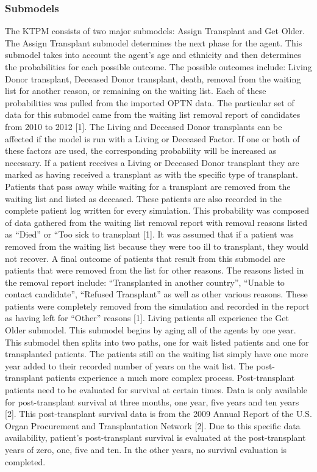 \documentclass[9pt,a4paper,twocolumn]{scrartcl}
\begin{document}
\subsubsection{Submodels}
The KTPM consists of two major submodels: Assign Transplant and Get Older.
The Assign Transplant submodel determines the next phase for the agent.  This submodel takes into account the agent’s age and ethnicity and then determines the probabilities for each possible outcome.  The possible outcomes include: Living Donor transplant, Deceased Donor transplant, death, removal from the waiting list for another reason, or remaining on the waiting list.  Each of these probabilities was pulled from the imported OPTN data.  The particular set of data for this submodel came from the waiting list removal report of candidates from 2010 to 2012 [1].  The Living and Deceased Donor transplants can be affected if the model is run with a Living or Deceased Factor.  If one or both of these factors are used, the corresponding probability will be increased as necessary.
If a patient receives a Living or Deceased Donor transplant they are marked as having received a transplant as with the specific type of transplant.  Patients that pass away while waiting for a transplant are removed from the waiting list and listed as deceased.  These patients are also recorded in the complete patient log written for every simulation.  This probability was composed of data gathered from the waiting list removal report with removal reasons listed as “Died” or “Too sick to transplant [1].  It was assumed that if a patient was removed from the waiting list because they were too ill to transplant, they would not recover.  
A final outcome of patients that result from this submodel are patients that were removed from the list for other reasons.  The reasons listed in the removal report include: “Transplanted in another country”, “Unable to contact candidate”, “Refused Transplant” as well as other various reasons.  These patients were completely removed from the simulation and recorded in the report as having left for “Other” reasons [1].
Living patients all experience the Get Older submodel.  This submodel begins by aging all of the agents by one year.  This submodel then splits into two paths, one for wait listed patients and one for transplanted patients.  The patients still on the waiting list simply have one more year added to their recorded number of years on the wait list.  The post-transplant patients experience a much more complex process.
Post-transplant patients need to be evaluated for survival at certain times.  Data is only available for post-transplant survival at three months, one year, five years and ten years [2].  This post-transplant survival data is from the 2009 Annual Report of the U.S. Organ Procurement and Transplantation Network [2].  Due to this specific data availability, patient’s post-transplant survival is evaluated at the post-transplant years of zero, one, five and ten.  In the other years, no survival evaluation is completed.  
\end{document}
